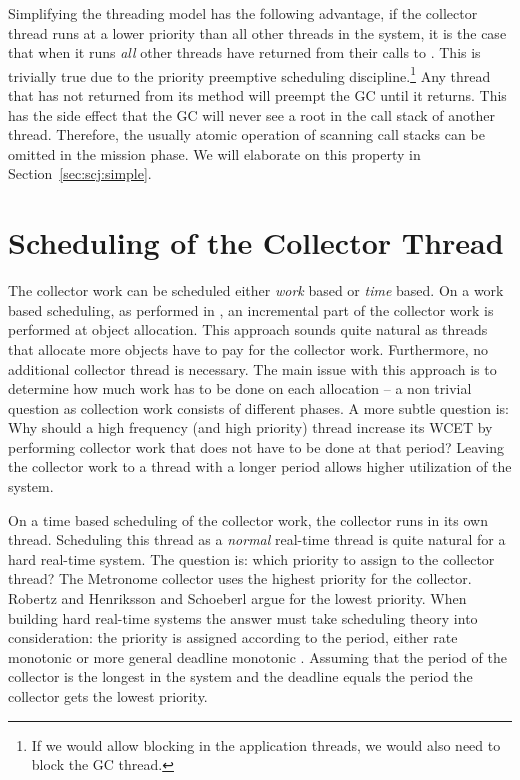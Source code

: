 Simplifying the threading model has the following advantage, if the
collector thread runs at a lower priority than all other threads in
the system, it is the case that when it runs \emph{all} other threads
have returned from their calls to . This is trivially
true due to the priority preemptive scheduling
discipline.\footnote{If we would allow blocking in the application
threads, we would also need to block the GC thread.} Any thread that
has not returned from its  method will preempt the GC
until it returns. This has the side effect that the GC will never see
a root in the call stack of another thread. Therefore, the usually
atomic operation of scanning call stacks can be omitted in the
mission phase. We will elaborate on this property in
Section~\ref{sec:scj:simple}.


\section{Scheduling of the Collector Thread}
\label{sec:gcsched}

The collector work can be scheduled either \emph{work} based or
\emph{time} based. On a work based scheduling, as performed in
\cite{gc:siebert:phd}, an incremental part of the collector work is
performed at object allocation. This approach sounds quite natural as
threads that allocate more objects have to pay for the collector
work. Furthermore, no additional collector thread is necessary. The
main issue with this approach is to determine how much work has to be
done on each allocation -- a non trivial question as collection work
consists of different phases. A more subtle question is: Why should a
high frequency (and high priority) thread increase its WCET by
performing collector work that does not have to be done at that
period? Leaving the collector work to a thread with a longer period
allows higher utilization of the system.

On a time based scheduling of the collector work, the collector runs
in its own thread. Scheduling this thread as a \emph{normal}
real-time thread is quite natural for a hard real-time system. The
question is: which priority to assign to the collector thread? The
Metronome collector \cite{gc:bacon03} uses the highest priority for
the collector. Robertz and Henriksson \cite{780745} and Schoeberl
\cite{jop:rtgc_sched} argue for the lowest priority. When building
hard real-time systems the answer must take scheduling theory into
consideration: the priority is assigned according to the period,
either rate monotonic \cite{321743} or more general deadline
monotonic \cite{Audsley-etal91}. Assuming that the period of the
collector is the longest in the system and the deadline equals the
period the collector gets the lowest priority.

